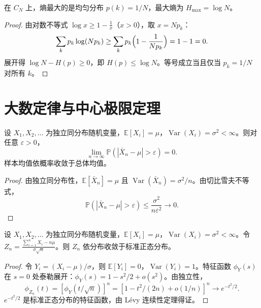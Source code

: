 \begin{proposition}[均匀分布的最大熵]\label{prop:uniform_max_entropy}
在 $C_N$ 上，熵最大的是均匀分布 $p(k) = 1/N$，最大熵为 $H_{\max} = \log N$。
\end{proposition}

\begin{proof}
由对数不等式 $\log x \ge 1 - \frac{1}{x}$（$x > 0$），取 $x = N p_k$：
\[
\sum_{k} p_k \log(N p_k) \ge \sum_{k} p_k \Bigl( 1 - \frac{1}{N p_k} \Bigr) = 1 - 1 = 0.
\]
展开得 $\log N - H(p) \ge 0$，即 $H(p) \le \log N$。等号成立当且仅当 $p_k = 1/N$ 对所有 $k$。
\end{proof}

\section{大数定律与中心极限定理}\label{sec:lln_clt}

\begin{theorem}[弱大数定律]\label{thm:weak_law_of_large_numbers}
设 $X_1, X_2, \dots$ 为独立同分布随机变量，$\mathbb{E}[X_i] = \mu$，$\operatorname{Var}(X_i) = \sigma^2 < \infty$。则对任意 $\varepsilon > 0$，
\[
\lim_{n \to \infty} \mathbb{P}(|\bar{X}_n - \mu| > \varepsilon) = 0.
\]
样本均值依概率收敛于总体均值。
\end{theorem}

\begin{proof}
由独立同分布性，$\mathbb{E}[\bar{X}_n] = \mu$ 且 $\operatorname{Var}(\bar{X}_n) = \sigma^2/n$。由切比雪夫不等式，
\[
\mathbb{P}(|\bar{X}_n - \mu| > \varepsilon) \le \frac{\sigma^2}{n\varepsilon^2} \to 0.
\]
\end{proof}

\begin{theorem}[中心极限定理]\label{thm:central_limit_theorem}
设 $X_1, X_2, \dots$ 为独立同分布随机变量，$\mathbb{E}[X_i] = \mu$，$\operatorname{Var}(X_i) = \sigma^2 < \infty$。令 $Z_n = \frac{\sum_{i=1}^n X_i - n\mu}{\sigma\sqrt{n}}$。则 $Z_n$ 依分布收敛于标准正态分布。
\end{theorem}

\begin{proof}
令 $Y_i = (X_i - \mu)/\sigma$，则 $\mathbb{E}[Y_i] = 0$，$\operatorname{Var}(Y_i) = 1$。特征函数 $\phi_Y(s)$ 在 $s = 0$ 处泰勒展开：$\phi_Y(s) = 1 - s^2/2 + o(s^2)$。由独立性，
\[
\phi_{Z_n}(t) = [\phi_Y(t/\sqrt{n})]^n = [1 - t^2/(2n) + o(1/n)]^n \to e^{-t^2/2}.
\]
$e^{-t^2/2}$ 是标准正态分布的特征函数，由 Lévy 连续性定理得证。
\end{proof}

